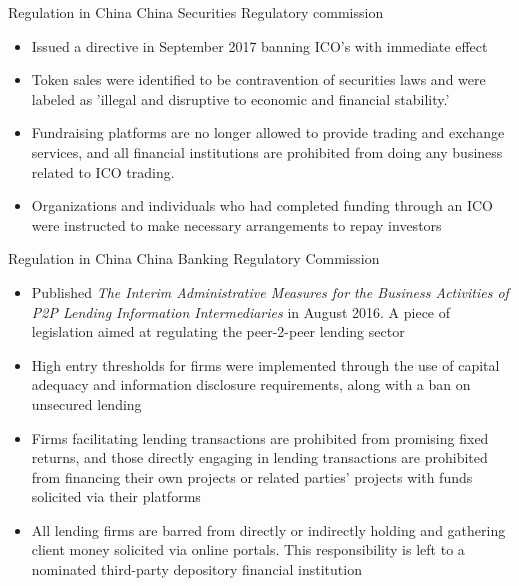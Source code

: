 \documentclass[10pt]{beamer}
\begin{document}
\begin{frame}{Regulation in China}
	China Securities Regulatory commission
	\begin{itemize}
		\item Issued a directive in September 2017 banning ICO's with immediate effect
		\item Token sales were identified to be contravention of securities laws and were labeled as 'illegal and disruptive to economic and financial stability.'
		\item Fundraising platforms are no longer allowed to provide trading and exchange services, and all financial institutions are prohibited from doing any business related to ICO trading.
		\item Organizations and individuals who had completed funding through an ICO were instructed to make necessary arrangements to repay investors
	\end{itemize}
\end{frame}


\begin{frame}{Regulation in China}
	China Banking Regulatory Commission
	\begin{itemize}
		\item Published \textit{The Interim Administrative Measures for the Business Activities of P2P Lending Information Intermediaries} in August 2016. A piece of legislation aimed at regulating the peer-2-peer lending sector
		\item High entry thresholds for firms were implemented through the use of capital adequacy and information disclosure requirements, along with a ban on unsecured lending
		\item Firms facilitating lending transactions are prohibited from promising fixed returns, and those directly engaging in lending transactions are prohibited from financing their own projects or related parties' projects with funds solicited via their platforms
		\item All lending firms are barred from directly or indirectly holding and gathering client money solicited via online portals. This responsibility is left to a nominated third-party depository financial institution
	\end{itemize}
\end{frame}

\end{document}
